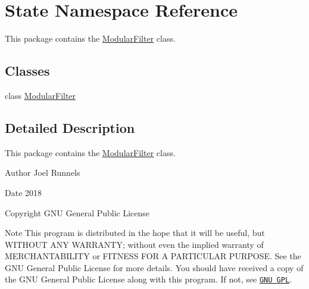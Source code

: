\hypertarget{namespaceState}{}\section{State Namespace Reference}
\label{namespaceState}


This package contains the \hyperlink{classState_1_1ModularFilter}{Modular\+Filter} class.  


\subsection*{Classes}
\begin{DoxyCompactItemize}
\item 
class \hyperlink{classState_1_1ModularFilter}{Modular\+Filter}
\end{DoxyCompactItemize}


\subsection{Detailed Description}
This package contains the \hyperlink{classState_1_1ModularFilter}{Modular\+Filter} class. 

\begin{DoxyAuthor}{Author}
Joel Runnels 
\end{DoxyAuthor}
\begin{DoxyDate}{Date}
2018 
\end{DoxyDate}
\begin{DoxyCopyright}{Copyright}
G\+NU General Public License
\end{DoxyCopyright}
\begin{DoxyNote}{Note}
This program is distributed in the hope that it will be useful, but W\+I\+T\+H\+O\+UT A\+NY W\+A\+R\+R\+A\+N\+TY; without even the implied warranty of M\+E\+R\+C\+H\+A\+N\+T\+A\+B\+I\+L\+I\+TY or F\+I\+T\+N\+E\+SS F\+OR A P\+A\+R\+T\+I\+C\+U\+L\+AR P\+U\+R\+P\+O\+SE. See the G\+NU General Public License for more details. You should have received a copy of the G\+NU General Public License along with this program. If not, see \href{http://www.gnu.org/licenses/}{\tt G\+NU G\+PL}. 
\end{DoxyNote}
